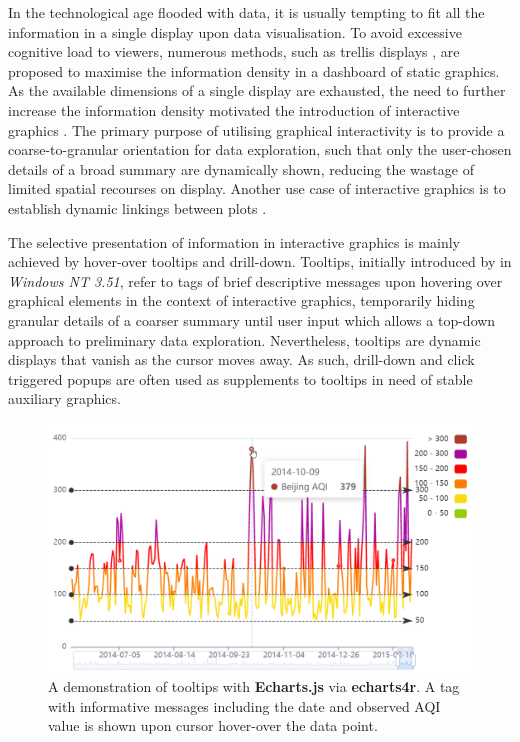 \documentclass{aucklandthesis}
\begin{document}
In the technological age flooded with data, it is usually tempting to fit all the information in a single display upon data visualisation. To avoid excessive cognitive load to viewers, numerous methods, such as trellis displays \autocite{trellis}, are proposed to maximise the information density in a dashboard of static graphics. As the available dimensions of a single display are exhausted, the need to further increase the information density motivated the introduction of interactive graphics \autocite{intg}. The primary purpose of utilising graphical interactivity is to provide a coarse-to-granular orientation for data exploration, such that only the user-chosen details of a broad summary are dynamically shown, reducing the wastage of limited spatial recourses on display. Another use case of interactive graphics is to establish dynamic linkings between plots \autocite{intg}.

The selective presentation of information in interactive graphics is mainly achieved by hover-over tooltips and drill-down. Tooltips, initially introduced by \textcite{tt} in \emph{Windows NT 3.51}, refer to tags of brief descriptive messages upon hovering over graphical elements in the context of interactive graphics, temporarily hiding granular details of a coarser summary until user input which allows a top-down approach to preliminary data exploration. Nevertheless, tooltips are dynamic displays that vanish as the cursor moves away. As such, drill-down \autocite{plotly} and click triggered popups are often used as supplements to tooltips in need of stable auxiliary graphics.

\begin{figure}
\includegraphics[width=1\linewidth]{figures/tt-demo} \caption{A demonstration of tooltips with \textbf{Echarts.js} via \textbf{echarts4r}. A tag with informative messages including the date and observed AQI value is shown upon cursor hover-over the data point.}\label{fig:tt-demo}
\end{figure}
\end{document}
